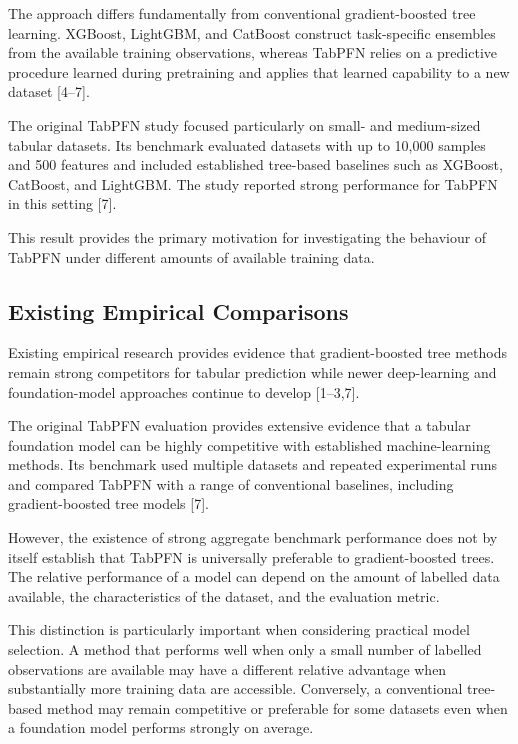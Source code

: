 The approach differs fundamentally from conventional gradient-boosted tree learning. XGBoost, LightGBM, and CatBoost construct task-specific ensembles from the available training observations, whereas TabPFN relies on a predictive procedure learned during pretraining and applies that learned capability to a new dataset {[}4--7{]}.

The original TabPFN study focused particularly on small- and medium-sized tabular datasets. Its benchmark evaluated datasets with up to 10,000 samples and 500 features and included established tree-based baselines such as XGBoost, CatBoost, and LightGBM. The study reported strong performance for TabPFN in this setting {[}7{]}.

This result provides the primary motivation for investigating the behaviour of TabPFN under different amounts of available training data.

\subsection{Existing Empirical Comparisons}\label{existing-empirical-comparisons}

Existing empirical research provides evidence that gradient-boosted tree methods remain strong competitors for tabular prediction while newer deep-learning and foundation-model approaches continue to develop {[}1--3,7{]}.

The original TabPFN evaluation provides extensive evidence that a tabular foundation model can be highly competitive with established machine-learning methods. Its benchmark used multiple datasets and repeated experimental runs and compared TabPFN with a range of conventional baselines, including gradient-boosted tree models {[}7{]}.

However, the existence of strong aggregate benchmark performance does not by itself establish that TabPFN is universally preferable to gradient-boosted trees. The relative performance of a model can depend on the amount of labelled data available, the characteristics of the dataset, and the evaluation metric.

This distinction is particularly important when considering practical model selection. A method that performs well when only a small number of labelled observations are available may have a different relative advantage when substantially more training data are accessible. Conversely, a conventional tree-based method may remain competitive or preferable for some datasets even when a foundation model performs strongly on average.

